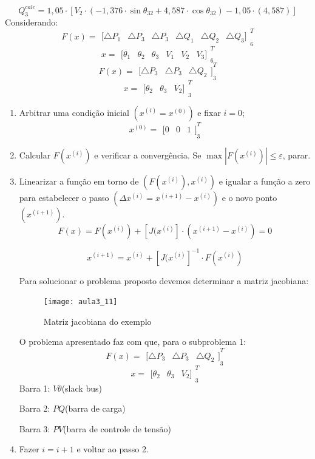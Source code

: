 \[
Q_{3}^{calc}=1,05\cdot[V_{2}\cdot(-1,376\cdot\sin\theta_{32}+4,587\cdot\cos\theta_{32})-1,05\cdot(4,587)]
\]
Considerando:
\[
F(x)={ \begin{matrix} [\triangle { P }_{ 1 } & \triangle { P }_{ 3 } & \triangle { P }_{ 3 } & \triangle { Q }_{ 1 } & \triangle { Q }_{ 2 } & \triangle { Q }_{ 3 }] \end{matrix} }_{ 6 }^{ T }
\]
\[
x={ \begin{matrix} [\theta _{ 1 } & \theta _{ 2 } & \theta _{ 3 } & V_{ 1 } & V_{ 2 } & V_{ 3 }] \end{matrix} }_{ 6 }^{ T }
\]
\[
F(x)={ \begin{matrix} [\triangle { P }_{ 3 } & \triangle { P }_{ 3 } & \triangle { Q }_{ 2 } \end{matrix}] }_{ 3 }^{ T }
\]
\[
x={ \begin{matrix} [\theta _{ 2 } & \theta _{ 3 } & V_{ 2 }] \end{matrix} }_{ 3 }^{ T }
\]
\begin{enumerate}
\item Arbitrar uma condição inicial $(x^{(i)}=x^{(0)})$ e fixar $i=0$;
\[
{ x }^{ (0) }={ \begin{matrix} [0 & 0 & 1 \end{matrix}] }_{ 3 }^{ T }
\]
\item Calcular $F(x^{(i)})$ e verificar a convergência. Se $\max| F(x^{(i)})|\leq \varepsilon$,
parar.
\item Linearizar a função em torno de $(F(x^{(i)}),x^{(i)})$ e igualar
a função a zero para estabelecer o passo $(\varDelta x^{(i)}=x^{(i+1)}-x^{(i)})$
e o novo ponto $(x^{(i+1)})$.
\[
F(x)=F(x^{(i)})+[J(x^{(i)}]\cdot(x^{(i+1)}-x^{(i)})=0
\]
 
\[
x^{(i+1)}=x^{(i)}+[J(x^{(i)}]^{-1}\cdot F(x^{(i)})
\]


Para solucionar o problema proposto devemos determinar a matriz jacobiana:
\begin{figure}[H]
\begin{centering}
\texttt{[image: aula3\_11]}\protect\caption{\label{fig:aula3_11} Matriz jacobiana do exemplo }
\end{centering}
\end{figure}
O problema apresentado faz com que, para o subproblema 1:
\[
F(x)={ \begin{matrix} [\triangle { P }_{ 3 } & \triangle { P }_{ 3 } & \triangle { Q }_{ 2 } \end{matrix}] }_{ 3 }^{ T }
\]
\[
x={ \begin{matrix} [\theta _{ 2 } & \theta _{ 3 } & V_{ 2 }] \end{matrix} }_{ 3 }^{ T }
\]
Barra 1: $V\theta$(slack bus)

Barra 2: $PQ$(barra de carga)

Barra 3: $PV$(barra de controle de tensão)
\item Fazer $i=i+1$ e voltar ao passo 2.

\end{enumerate}

